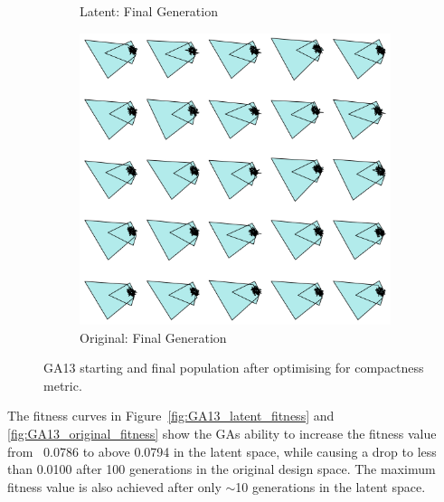 \documentclass{article}
\begin{document}
\begin{figure}[H]
\begin{subfigure}[b]{0.32\textwidth}
        \caption{Latent: Final Generation}
        \label{fig:GA13_latent_final}
    \end{subfigure}
    \hfill
    \begin{subfigure}[b]{0.32\textwidth}
        \centering
        \includegraphics[width=\textwidth]{figures/GAResults/GA13/original/original_final_gen.png}
        \caption{Original: Final Generation}
        \label{fig:GA13_original_final}
    \end{subfigure}
    \caption{GA13 starting and final population after optimising for compactness metric.}
    \label{fig:GA13_before_after_GA}
\end{figure}

The fitness curves in Figure~\ref{fig:GA13_latent_fitness} and \ref{fig:GA13_original_fitness} show the GAs ability to increase the fitness value from ~0.0786 to above 0.0794 in the latent space, while causing a drop to less than 0.0100 after 100 generations in the original design space. The maximum fitness value is also achieved after only $\sim$10 generations in the latent space. 
\end{document}
